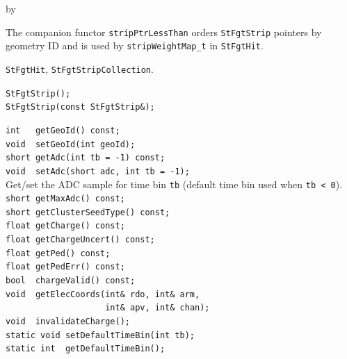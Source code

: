 \documentclass[twoside]{article}
\newcommand{\entrylabel}[1]{\mbox{\textbf{{#1}}}\hfil}%
\newenvironment{entry}
{\begin{list}{}%
    {\renewcommand{\makelabel}{\entrylabel}%
     \setlength{\labelwidth}{90pt}%
     \setlength{\leftmargin}{\labelwidth}
     \advance\leftmargin by \labelsep%
      }%
    }%
  {\end{list}}
\newcommand{\Entrylabel}[1]%
{\raisebox{0pt}[1ex][0pt]{\makebox[\labelwidth][l]%
    {\parbox[t]{\labelwidth}{\hspace{0pt}\textbf{{#1}}}}}}
\newenvironment{Entry}%
{\renewcommand{\entrylabel}{\Entrylabel}\begin{entry}}%
  {\end{entry}}
\begin{document}
\begin{Entry}
  The companion functor \texttt{stripPtrLessThan} orders \texttt{StFgtStrip} pointers by
  geometry ID and is used by \texttt{stripWeightMap\_t} in \texttt{StFgtHit}.
\item[Related Classes]
  \texttt{StFgtHit}, \texttt{StFgtStripCollection}.
\item[Public\\ Constructors]
    \verb+StFgtStrip();+\\
    \verb+StFgtStrip(const StFgtStrip&);+\\
\item[Public Member\\ Functions]
    \verb+int   getGeoId() const;+\\
    \verb+void  setGeoId(int geoId);+\\
    \verb+short getAdc(int tb = -1) const;+\\
    \verb+void  setAdc(short adc, int tb = -1);+\\
    Get/set the ADC sample for time bin \texttt{tb} (default time bin used when \texttt{tb < 0}).\\[2pt]
    \verb+short getMaxAdc() const;+\\
    \verb+short getClusterSeedType() const;+\\
    \verb+float getCharge() const;+\\
    \verb+float getChargeUncert() const;+\\
    \verb+float getPed() const;+\\
    \verb+float getPedErr() const;+\\
    \verb+bool  chargeValid() const;+\\
    \verb+void  getElecCoords(int& rdo, int& arm,+\\
    \verb+                    int& apv, int& chan);+\\
    \verb+void  invalidateCharge();+\\
    \verb+static void setDefaultTimeBin(int tb);+\\
    \verb+static int  getDefaultTimeBin();+\\
\end{Entry}
\clearpage
\end{document}
